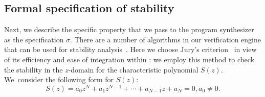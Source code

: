 \documentclass[twocolumn]{autart}    %
\begin{document}
\subsection{Formal specification of stability} 
\label{ssec:stabspecification}


Next, we describe the specific property that we pass to the program
synthesizer as the specification $\sigma$.  There are a number of 
algorithms in our verification engine that can be used for stability analysis~\cite{daes20161, Bessa16}.  
Here we choose Jury's criterion~\cite{astrom1997computer} in view of its efficiency 
and ease of integration within \tool: 
we employ this method to check the stability in the $z$-domain for the
characteristic polynomial $S(z)$.
%
%
We~consider the following form for $S(z)$:
%
\begin{equation*}
S(z) = a_0z^N+a_1z^{N-1}+\cdots+a_{N-1}z+a_N=0, a_0\neq0. 
\end{equation*}
\end{document}
